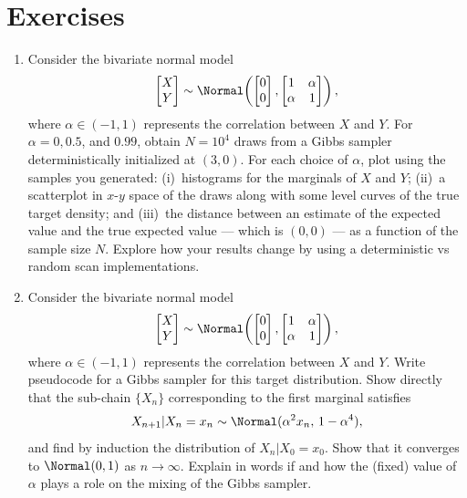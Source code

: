 
\section{Exercises}
\label{sec:5.5}

\begin{enumerate}

\item[\textbf{5.1}] Consider the bivariate normal model
  \[
    \begin{bmatrix} X \\ Y \end{bmatrix}
    \sim \Normal\!\left(
      \begin{bmatrix} 0 \\ 0 \end{bmatrix},
      \begin{bmatrix} 1 & \alpha \\ \alpha & 1 \end{bmatrix}
    \right),
  \]
  where $\alpha \in (-1, 1)$ represents the correlation between $X$ and $Y$. For
  $\alpha = 0, 0.5$, and $0.99$, obtain $N = 10^4$ draws from a Gibbs sampler
  deterministically initialized at $(3, 0)$. For each choice of $\alpha$, plot using the
  samples you generated: (i)~histograms for the marginals of $X$ and $Y$; (ii)~a scatterplot
  in $x$-$y$ space of the draws along with some level curves of the true target density; and
  (iii)~the distance between an estimate of the expected value and the true expected value ---
  which is $(0, 0)$ --- as a function of the sample size $N$. Explore how your results change
  by using a deterministic vs random scan implementations.

\item[\textbf{5.2}] Consider the bivariate normal model
  \[
    \begin{bmatrix} X \\ Y \end{bmatrix}
    \sim \Normal\!\left(
      \begin{bmatrix} 0 \\ 0 \end{bmatrix},
      \begin{bmatrix} 1 & \alpha \\ \alpha & 1 \end{bmatrix}
    \right),
  \]
  where $\alpha \in (-1, 1)$ represents the correlation between $X$ and $Y$. Write pseudocode
  for a Gibbs sampler for this target distribution. Show directly that the sub-chain
  $\{X_n\}$ corresponding to the first marginal satisfies
  \[
    X_{n+1} | X_n = x_n \sim \Normal(\alpha^2 x_n,\, 1 - \alpha^4),
  \]
  and find by induction the distribution of $X_n | X_0 = x_0$. Show that it converges to
  $\Normal(0, 1)$ as $n \to \infty$. Explain in words if and how the (fixed) value of $\alpha$
  plays a role on the mixing of the Gibbs sampler.


\end{enumerate}

